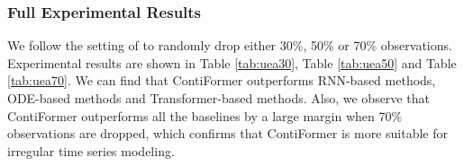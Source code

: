 \subsubsection{Full Experimental Results} \label{sec:full}

We follow the setting of \cite{kidger2020neural} to randomly drop either 30\%, 50\% or 70\% observations. Experimental results are shown in Table \ref{tab:uea30}, Table \ref{tab:uea50} and Table \ref{tab:uea70}. We can find that ContiFormer outperforms RNN-based methods, ODE-based methods and Transformer-based methods. Also, we observe that ContiFormer outperforms all the baselines by a large margin when 70\% observations are dropped, which confirms that ContiFormer is more suitable for irregular time series modeling.

\begin{table}[htbp]
\centering
\caption{Experimental result on UEA when 30\% observations are dropped. (ODE. stands for ODE-RNN, N. CDE stands for Neural CDE, ACC. stands for Accuracy.)}
\end{table}
